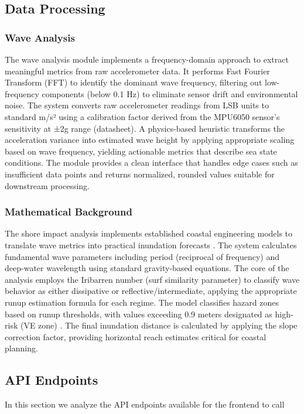 \documentclass{article}
\begin{document}
\subsection{Data Processing}

    \subsubsection{Wave Analysis}
    The wave analysis module implements a frequency-domain approach to extract meaningful metrics from raw accelerometer data. It performs Fast Fourier Transform (FFT) to identify the dominant wave frequency, filtering out low-frequency components (below 0.1 Hz) to eliminate sensor drift and environmental noise. The system converts raw accelerometer readings from LSB units to standard m/s² using a calibration factor derived from the MPU6050 sensor's sensitivity at ±2g range (datasheet). A physics-based heuristic transforms the acceleration variance into estimated wave height by applying appropriate scaling based on wave frequency, yielding actionable metrics that describe sea state conditions. The module provides a clean interface that handles edge cases such as insufficient data points and returns normalized, rounded values suitable for downstream processing.

    \subsubsection{Mathematical Background}
    The shore impact analysis implements established coastal engineering models to translate wave metrics into practical inundation forecasts \cite{stockdon2006}. The system calculates fundamental wave parameters including period (reciprocal of frequency) and deep-water wavelength using standard gravity-based equations. The core of the analysis employs the Iribarren number (surf similarity parameter) to classify wave behavior as either dissipative or reflective/intermediate, applying the appropriate runup estimation formula for each regime. The model classifies hazard zones based on runup thresholds, with values exceeding 0.9 meters designated as high-risk (VE zone) \cite{fema2022}. The final inundation distance is calculated by applying the slope correction factor, providing horizontal reach estimates critical for coastal planning.

\subsection{API Endpoints}
In this section we analyze the API endpoints available for the frontend to call
\end{document}
